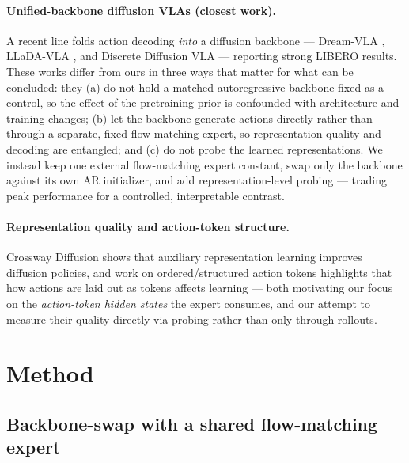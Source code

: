 \documentclass{article}
\begin{document}
\paragraph{Unified-backbone diffusion VLAs (closest work).} A recent line folds
action decoding \emph{into} a diffusion backbone --- Dream-VLA \cite{dreamvla},
LLaDA-VLA \cite{lladavla}, and Discrete Diffusion VLA \cite{discretediffvla} ---
reporting strong LIBERO results. These works differ from ours in three ways that
matter for what can be concluded: they (a) do not hold a matched autoregressive
backbone fixed as a control, so the effect of the pretraining prior is
confounded with architecture and training changes; (b) let the backbone generate
actions directly rather than through a separate, fixed flow-matching expert, so
representation quality and decoding are entangled; and (c) do not probe the
learned representations. We instead keep one external flow-matching expert
constant, swap only the backbone against its own AR initializer, and add
representation-level probing --- trading peak performance for a controlled,
interpretable contrast.

\paragraph{Representation quality and action-token structure.} Crossway Diffusion
\cite{crossway} shows that auxiliary representation learning improves diffusion
policies, and work on ordered/structured action tokens \cite{oat} highlights that
how actions are laid out as tokens affects learning --- both motivating our focus
on the \emph{action-token hidden states} the expert consumes, and our attempt to
measure their quality directly via probing rather than only through rollouts.

\section{Method}
\subsection{Backbone-swap with a shared flow-matching expert}
\end{document}
